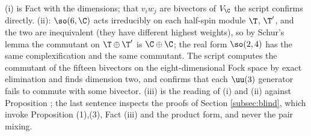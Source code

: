 (i) is Fact  with the dimensions; that $v_{i}w_{j}$ are bivectors of $V_{\C}$ the script confirms directly. (ii): $\so(6,\C)$ acts irreducibly on each half-spin module $\T$, $\T'$, and the two are inequivalent (they have different highest weights), so by Schur's lemma the commutant on $\T \oplus \T'$ is $\C \oplus \C$; the real form $\so(2,4)$ has the same complexification and the same commutant. The script computes the commutant of the fifteen bivectors on the eight-dimensional Fock space by exact elimination and finds dimension two, and confirms that each $\uu(3)$ generator fails to commute with some bivector. (iii) is the reading of (i) and (ii) against Proposition ; the last sentence inspects the proofs of Section \ref{subsec:blind}, which invoke Proposition (1),(3), Fact (iii) and the product form, and never the pair mixing.
